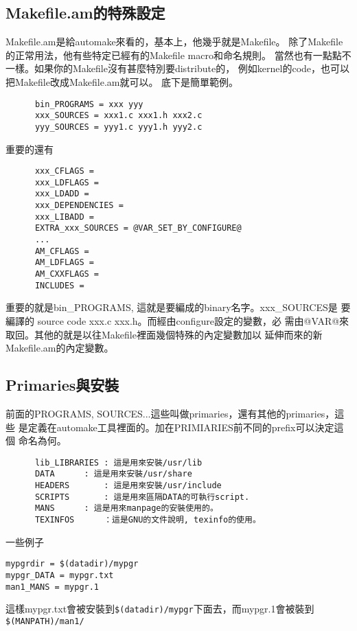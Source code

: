  \subsection{Makefile.am的特殊設定}
  Makefile.am是給automake來看的，基本上，他幾乎就是Makefile。
  除了Makefile的正常用法，他有些特定已經有的Makefile macro和命名規則。
  當然也有一點點不一樣。如果你的Makefile沒有甚麼特別要distribute的，
  例如kernel的code，也可以把Makefile改成Makefile.am就可以。
  底下是簡單範例。
  \begin{verbatim}
      bin_PROGRAMS = xxx yyy
      xxx_SOURCES = xxx1.c xxx1.h xxx2.c
      yyy_SOURCES = yyy1.c yyy1.h yyy2.c
  \end{verbatim}
      重要的還有
  \begin{verbatim}
      xxx_CFLAGS = 
      xxx_LDFLAGS =
      xxx_LDADD = 
      xxx_DEPENDENCIES =
      xxx_LIBADD = 
      EXTRA_xxx_SOURCES = @VAR_SET_BY_CONFIGURE@
      ...
      AM_CFLAGS =
      AM_LDFLAGS =
      AM_CXXFLAGS = 
      INCLUDES =
  \end{verbatim}
  重要的就是bin\_PROGRAMS, 這就是要編成的binary名字。xxx\_SOURCES是
  要編譯的 source code xxx.c xxx.h。而經由configure設定的變數，必
  需由@VAR@來取回。其他的就是以往Makefile裡面幾個特殊的內定變數加以
  延伸而來的新Makefile.am的內定變數。
  \subsection{Primaries與安裝}
  前面的PROGRAMS, SOURCES...這些叫做primaries，還有其他的primaries，這些
  是定義在automake工具裡面的。加在PRIMIARIES前不同的prefix可以決定這個
  命名為何。
  \begin{verbatim}
      lib_LIBRARIES	: 這是用來安裝/usr/lib
      DATA		: 這是用來安裝/usr/share
      HEADERS		: 這是用來安裝/usr/include
      SCRIPTS		: 這是用來區隔DATA的可執行script.
      MANS		: 這是用來manpage的安裝使用的。
      TEXINFOS		：這是GNU的文件說明, texinfo的使用。
  \end{verbatim}
	一些例子
  \begin{verbatim}
mypgrdir = $(datadir)/mypgr
mypgr_DATA = mypgr.txt
man1_MANS = mypgr.1
  \end{verbatim}
  這樣mypgr.txt會被安裝到\verb=$(datadir)/mypgr=下面去，而mypgr.1會被裝到
  \verb=$(MANPATH)/man1/=
	
